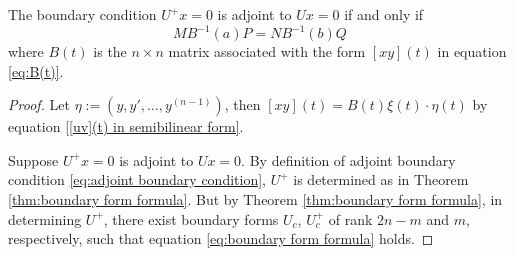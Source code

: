\documentclass[11pt, oneside, a4paper]{article}
\begin{document}
\begin{thm}\cite[p.289]{CoddingtonLevinson}\label{thm:condition iff adjoint}
    The boundary condition $U^+x=0$ is adjoint to $Ux=0$ if and only if
    \begin{equation}\label{eq:condition iff adjoint}
        MB^{-1}(a)P = NB^{-1}(b)Q
    \end{equation}
    where $B(t)$ is the $n\times n$ matrix associated with the form $[xy](t)$ in equation \eqref{eq:B(t)}.
\end{thm}
\begin{proof}
    Let $\eta := (y, y', \ldots, y^{(n-1)})$,
    then $[xy](t)=B(t)\xi(t)\cdot \eta(t)$ by equation \eqref{[uv](t) in semibilinear form}.

    Suppose $U^+x=0$ is adjoint to $Ux=0$. By definition of adjoint boundary condition \eqref{eq:adjoint boundary condition}, $U^+$ is determined as in Theorem \ref{thm:boundary form formula}. But by Theorem \ref{thm:boundary form formula}, in determining $U^+$, there exist boundary forms $U_c$, $U_c^+$ of rank $2n-m$ and $m$, respectively, such that equation \eqref{eq:boundary form formula} holds. 


\end{proof}
\end{document}
